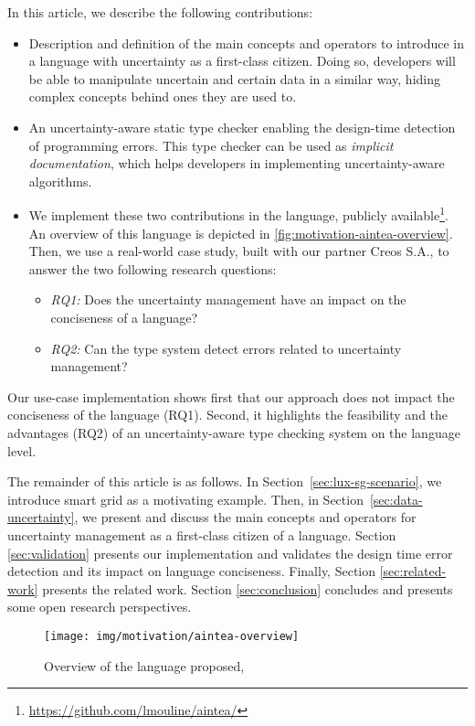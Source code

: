 In this article, we describe the following contributions: 
\begin{itemize}
	\vspace{-0.5em}
	\setlength\itemsep{-0.3em}
    \item Description and definition of the main concepts and operators to introduce in a language with uncertainty as a first-class citizen. Doing so, developers will be able to manipulate uncertain and certain data in a similar way, hiding complex concepts behind ones they are used to. 
    \item An uncertainty-aware static type checker enabling the design-time detection of programming errors. This type checker can be used as \textit{implicit documentation}, which helps developers in implementing uncertainty-aware algorithms.
    \item We implement these two contributions in the \languageName{} language, publicly available\footnote{\url{https://github.com/lmouline/aintea/}}. An overview of this language is depicted in \autoref{fig:motivation-aintea-overview}. Then, we use a real-world case study, built with our partner Creos S.A., to answer the two following research questions: 
    \begin{itemize}
   		\vspace{-0.5em}
		\setlength\itemsep{-0.3em}
    	\item \textit{RQ1:} Does the uncertainty management have an impact on the conciseness of a language? 
		\item \textit{RQ2:} Can the type system detect errors related to uncertainty management?
    \end{itemize}
\end{itemize}

Our use-case implementation shows first that our approach does not impact the conciseness of the language (RQ1).
Second, it highlights the feasibility and the advantages (RQ2) of an uncertainty-aware type checking system on the language level.

The remainder of this article is as follows.
In Section~\ref{sec:lux-sg-scenario}, we introduce smart grid as a motivating example. 
Then, in Section~\ref{sec:data-uncertainty}, we present and discuss the main concepts and operators for uncertainty management as a first-class citizen of a language. 
Section \ref{sec:validation} presents our \languageName{} implementation and validates the design time error detection and its impact on language conciseness. 
Finally, Section \ref{sec:related-work} presents the related work.
Section \ref{sec:conclusion} concludes and presents some open research perspectives. 


\begin{figure}
	\centering
	\texttt{[image: img/motivation/aintea-overview]}
	\caption{Overview of the language proposed, \languageName{}}
	\label{fig:motivation-aintea-overview}
\end{figure}
